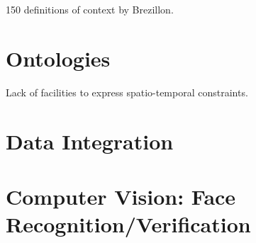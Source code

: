 150 definitions of context by Brezillon.

\section{Ontologies}
Lack of facilities to express spatio-temporal constraints.

\section{Data Integration}

\section{Computer Vision: Face Recognition/Verification}